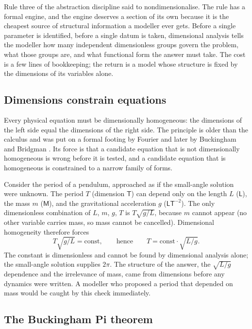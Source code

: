 Rule three of the abstraction discipline said to nondimensionalise. The
rule has a formal engine, and the engine deserves a section of its own
because it is the cheapest source of structural information a modeller
ever gets. Before a single parameter is identified, before a single
datum is taken, dimensional analysis tells the modeller how many
independent dimensionless groups govern the problem, what those groups
are, and what functional form the answer must take. The cost is a few
lines of bookkeeping; the return is a model whose structure is fixed by
the dimensions of its variables alone.

\subsection{Dimensions constrain equations}

Every physical equation must be dimensionally homogeneous: the
dimensions of the left side equal the dimensions of the right side.
The principle is older than the calculus and was put on a formal
footing by Fourier and later by Buckingham
\cite{paper:buckingham1914} and Bridgman \cite{text:bridgman1922}. Its
force is that a candidate equation that is not dimensionally homogeneous
is wrong before it is tested, and a candidate equation that is
homogeneous is constrained to a narrow family of forms.

Consider the period of a pendulum, approached as if the small-angle
solution were unknown. The period $T$ (dimension $\mathsf{T}$) can
depend only on the length $L$ ($\mathsf{L}$), the mass $m$
($\mathsf{M}$), and the gravitational acceleration $g$
($\mathsf{L}\mathsf{T}^{-2}$). The only dimensionless combination of
$L$, $m$, $g$, $T$ is $T\sqrt{g/L}$, because $m$ cannot appear (no other
variable carries mass, so mass cannot be cancelled). Dimensional
homogeneity therefore forces
\[
T \sqrt{g/L} = \text{const},
\qquad\text{hence}\qquad
T = \text{const} \cdot \sqrt{L/g}.
\]
The constant is dimensionless and cannot be found by dimensional
analysis alone; the small-angle solution supplies $2\pi$. The structure
of the answer, the $\sqrt{L/g}$ dependence and the irrelevance of mass,
came from dimensions before any dynamics were written. A modeller who
proposed a period that depended on mass would be caught by this check
immediately.

\subsection{The Buckingham Pi theorem}

